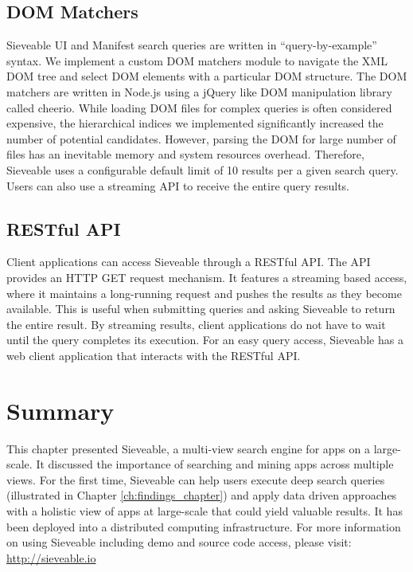 \subsection{DOM Matchers}

Sieveable UI and Manifest search queries are written in ``query-by-example'' syntax.
We implement a custom DOM matchers module to navigate the XML DOM tree and select DOM elements with a particular DOM structure.
The DOM matchers are written in Node.js using a jQuery like DOM manipulation library called cheerio.
While loading DOM files for complex queries is often considered expensive, the hierarchical indices we implemented significantly increased the number of potential candidates. 
However, parsing the DOM for large number of files has an inevitable memory and system resources overhead.
Therefore, Sieveable uses a configurable default limit of 10 results per a given search query.
Users can also use a streaming API to receive the entire query results.

\subsection{RESTful API}
Client applications can access Sieveable through a RESTful API. The API provides an HTTP GET request mechanism. It features a streaming based access, where it maintains a long-running request and pushes the results as they become available.
This is useful when submitting queries and asking Sieveable to return the entire result.
By streaming results, client applications do not have to wait until the query completes its execution. 
For an easy query access, Sieveable has a web client application that interacts with the RESTful API.


\section{Summary}
This chapter presented Sieveable, a multi-view search engine for apps on a large-scale.
It discussed the importance of searching and mining apps across multiple views.
For the first time, Sieveable can help users execute deep search queries (illustrated in Chapter \ref{ch:findings_chapter}) and apply data driven approaches with a holistic view of apps at large-scale that could yield valuable results.
It has been deployed into a distributed computing infrastructure.
For more information on using Sieveable including demo and source code access, please visit:
\url{http://sieveable.io}
